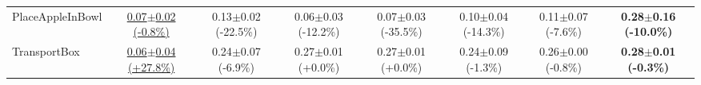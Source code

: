 \begin{table}[htbp]
\begin{adjustbox}{max width=\textwidth}
\begin{tabular}{l*{7}{c}}
PlaceAppleInBowl & \underline{0.07$\pm$0.02 \scriptsize{(-0.8\%)}} & 0.13$\pm$0.02 \scriptsize{(-22.5\%)} & 0.06$\pm$0.03 \scriptsize{(-12.2\%)} & 0.07$\pm$0.03 \scriptsize{(-35.5\%)} & 0.10$\pm$0.04 \scriptsize{(-14.3\%)} & 0.11$\pm$0.07 \scriptsize{(-7.6\%)} & \textbf{0.28$\pm$0.16 \scriptsize{(-10.0\%)}} \\
TransportBox & \underline{0.06$\pm$0.04 \scriptsize{(+27.8\%)}} & 0.24$\pm$0.07 \scriptsize{(-6.9\%)} & 0.27$\pm$0.01 \scriptsize{(+0.0\%)} & 0.27$\pm$0.01 \scriptsize{(+0.0\%)} & 0.24$\pm$0.09 \scriptsize{(-1.3\%)} & 0.26$\pm$0.00 \scriptsize{(-0.8\%)} & \textbf{0.28$\pm$0.01 \scriptsize{(-0.3\%)}} \\
\bottomrule
\end{tabular}
\end{adjustbox}
\end{table}

